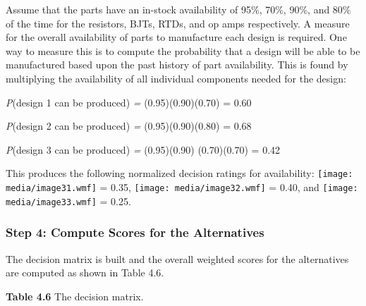 Assume that the parts have an in-stock availability of 95\%, 70\%, 90\%,
and 80\% of the time for the resistors, BJTs, RTDs, and op amps
respectively. A measure for the overall availability of parts to
manufacture each design is re­quired. One way to measure this is to
compute the probability that a design will be able to be manufactured
based upon the past history of part availability. This is found by
multiplying the availability of all individual components needed for the
design:

\emph{P}(design 1 can be produced) \emph{=} (0.95)(0.90)(0.70) = 0.60

\emph{P}(design 2 can be produced) \emph{=} (0.95)(0.90)(0.80) = 0.68

\emph{P}(design 3 can be produced) \emph{=} (0.95)(0.90) (0.70)(0.70) =
0.42

This produces the following normalized decision ratings for
availability: \texttt{[image: media/image31.wmf]} = 0.35,
\texttt{[image: media/image32.wmf]} = 0.40, and
\texttt{[image: media/image33.wmf]} = 0.25.

\subsubsection*{Step 4: Compute Scores for the
Alternatives}\label{step-4-compute-scores-for-the-alternatives}

The decision matrix is built and the overall weighted scores for the
alternatives are computed as shown in Table 4.6.

\textbf{Table 4.6} The decision matrix.

